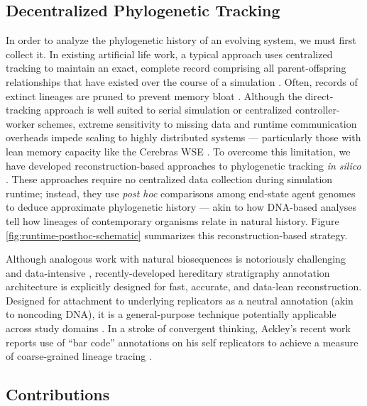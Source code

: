 \subsection{Decentralized Phylogenetic Tracking}

In order to analyze the phylogenetic history of an evolving system, we must first collect it.
In existing artificial life work, a typical approach uses centralized tracking to maintain an exact, complete record comprising all parent-offspring relationships that have existed over the course of a simulation \citep{ray1992evolution,bohm2017mabe,de2012deap,garwood2019revosim,godin2019apoget,dolson2024phylotrackpy}.
Often, records of extinct lineages are pruned to prevent memory bloat \citep{moreno2024analysis}.
Although the direct-tracking approach is well suited to serial simulation or centralized controller-worker schemes, extreme sensitivity to missing data and runtime communication overheads impede scaling to highly distributed systems --- particularly those with lean memory capacity like the Cerebras WSE \citep{moreno2024analysis}.
To overcome this limitation, we have developed reconstruction-based approaches to phylogenetic tracking \textit{in silico} \citep{moreno2022hereditary}.
These approaches require no centralized data collection during simulation runtime; instead, they use \textit{post hoc} comparisons among end-state agent genomes to deduce approximate phylogenetic history --- akin to how DNA-based analyses tell how lineages of contemporary organisms relate in natural history.
Figure \ref{fig:runtime-posthoc-schematic} summarizes this reconstruction-based strategy.

Although analogous work with natural biosequences is notoriously challenging and data-intensive \citep{neyman1971molecular,lemmon2013high},
recently-developed hereditary stratigraphy annotation architecture is explicitly designed for fast, accurate, and data-lean reconstruction.
Designed for attachment to underlying replicators as a neutral annotation (akin to noncoding DNA), it is a general-purpose technique potentially applicable across study domains \citep{liben2008tracing,cohen1987computer,friggeri2014rumor}.
In a stroke of convergent thinking, Ackley's recent work reports use of ``bar code'' annotations on his self replicators to achieve a measure of coarse-grained lineage tracing \citep{ackley2023robust}.

\subsection{Contributions}


